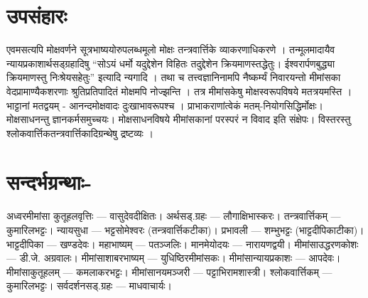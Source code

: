 \section*{उपसंहारः}

एवमसत्यपि मोक्षवर्णने सूत्रभाष्ययोरुपलब्धमूलो मोक्षः तन्त्रवार्त्तिके व्याकरणाधिकरणे । तन्मूलमादायैव न्यायप्रकाशार्थसड्ग्रहादिषु “सोऽयं धर्मो यदुद्देशेन विहितः तदु्द्देशेन क्रियमाणस्तद्धेतुः। ईश्वरार्पणबुद्ध्या क्रियमाणस्तु निःश्रेयसहेतुः” इत्यादि न्यगादि । तथा च तत्त्वज्ञानिनामपि नैष्कर्म्यं निवारयन्तो मीमांसका वेदप्रामाण्यैकशरणाः श्रुतिप्रतिपादितं मोक्षमपि नोज्झन्ति । तत्र मीमांसकेषु मोक्षस्वरूपविषये मतत्रयमस्ति । भाट्टानां मतद्वयम् - आनन्दमोक्षवादः दुःखाभावरूपश्च । प्राभाकराणांत्वेकं मतम्-नियोगसिद्धिर्मोक्षः। मोक्षसाधनन्तु ज्ञानकर्मसमुच्चयः। मोक्षसाधनविषये मीमांसकानां परस्परं न विवाद इति संक्षेपः। विस्तरस्तु श्लोकवार्त्तिकतन्त्रवार्त्तिकादिग्रन्थेषु द्रष्टव्यः ।
 
\section*{सन्दर्भग्रन्थाः-} 
 
\begin{thebibliography}{99}
 अध्वरमीमांसा कुतूहलवृत्तिः --- वासुदेवदीक्षितः।
 अर्थसड्.ग्रहः --- लौगाक्षिभास्करः।
 तन्त्रवार्त्तिकम् --- कुमारिलभट्टः।
 न्यायसुधा --- भट्टसोमेश्वरः (तन्त्रवार्त्तिकटीका)।
 प्रभावली --- शम्भुभट्टः (भाट्टदीपिकाटीका)।
 भाट्टदीपिका --- खण्डदेवः।
 महाभाष्यम् --- पतञ्जलिः।
 मानमेयोदयः --- नारायणद्वयी।
 मीमांसाउद्धरणकोशः --- डी.जे. अग्रवालः।
 मीमांसाशाबरभाष्यम् --- युधिष्ठिरमीमांसकः।
 मीमांसान्यायप्रकाशः --- आपदेवः।
 मीमांसाकुतूहलम् --- कमलाकरभट्टः।
 मीमांसानयमञ्जरी --- पट्टाभिरामशास्त्री।
 श्लोकवार्त्तिकम् --- कुमारिलभट्टः।
 सर्वदर्शनसड्.ग्रहः --- माधवाचार्यः।
\end{thebibliography}

\articleend

